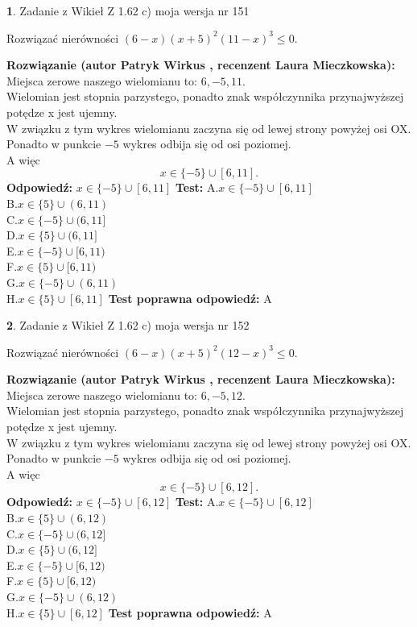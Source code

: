 \documentclass[12pt, a4paper]{article}
\theoremstyle{definition} %
\newtheorem{zad}{}
\newcommand{\zadStart}[1]{\begin{zad}#1\newline}
\newcommand{\zadStop}{\end{zad}}
\newcommand{\rozwStart}[2]{\noindent \textbf{Rozwiązanie (autor #1 , recenzent #2): }\newline}
\newcommand{\rozwStop}{\newline}
\newcommand{\odpStart}{\noindent \textbf{Odpowiedź:}\newline}
\newcommand{\odpStop}{\newline}
\newcommand{\testStart}{\noindent \textbf{Test:}\newline}
\newcommand{\testStop}{\newline}
\newcommand{\kluczStart}{\noindent \textbf{Test poprawna odpowiedź:}\newline}
\newcommand{\kluczStop}{\newline}
\begin{document}
\zadStart{Zadanie z Wikieł Z 1.62 c) moja wersja nr 151}

Rozwiązać nierówności $(6-x)(x+5)^{2}(11-x)^{3}\le0$.
\zadStop
\rozwStart{Patryk Wirkus}{Laura Mieczkowska}
Miejsca zerowe naszego wielomianu to: $6, -5, 11$.\\
Wielomian jest stopnia parzystego, ponadto znak współczynnika przy\linebreak najwyższej potędze x jest ujemny.\\ W związku z tym wykres wielomianu zaczyna się od lewej strony powyżej osi OX.\\
Ponadto w punkcie $-5$ wykres odbija się od osi poziomej.\\
A więc $$x \in \{-5\} \cup [6,11].$$
\rozwStop
\odpStart
$x \in \{-5\} \cup [6,11]$
\odpStop
\testStart
A.$x \in \{-5\} \cup [6,11]$\\
B.$x \in \{5\} \cup (6,11)$\\
C.$x \in \{-5\} \cup (6,11]$\\
D.$x \in \{5\} \cup (6,11]$\\
E.$x \in \{-5\} \cup [6,11)$\\
F.$x \in \{5\} \cup [6,11)$\\
G.$x \in \{-5\} \cup (6,11)$\\
H.$x \in \{5\} \cup [6,11]$
\testStop
\kluczStart
A
\kluczStop



\zadStart{Zadanie z Wikieł Z 1.62 c) moja wersja nr 152}

Rozwiązać nierówności $(6-x)(x+5)^{2}(12-x)^{3}\le0$.
\zadStop
\rozwStart{Patryk Wirkus}{Laura Mieczkowska}
Miejsca zerowe naszego wielomianu to: $6, -5, 12$.\\
Wielomian jest stopnia parzystego, ponadto znak współczynnika przy\linebreak najwyższej potędze x jest ujemny.\\ W związku z tym wykres wielomianu zaczyna się od lewej strony powyżej osi OX.\\
Ponadto w punkcie $-5$ wykres odbija się od osi poziomej.\\
A więc $$x \in \{-5\} \cup [6,12].$$
\rozwStop
\odpStart
$x \in \{-5\} \cup [6,12]$
\odpStop
\testStart
A.$x \in \{-5\} \cup [6,12]$\\
B.$x \in \{5\} \cup (6,12)$\\
C.$x \in \{-5\} \cup (6,12]$\\
D.$x \in \{5\} \cup (6,12]$\\
E.$x \in \{-5\} \cup [6,12)$\\
F.$x \in \{5\} \cup [6,12)$\\
G.$x \in \{-5\} \cup (6,12)$\\
H.$x \in \{5\} \cup [6,12]$
\testStop
\kluczStart
A
\kluczStop
\end{document}
